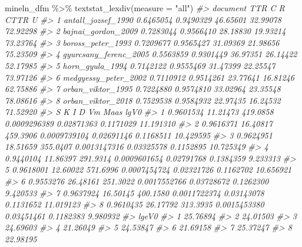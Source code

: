 \documentclass[
]{book}
\newenvironment{Shaded}{\begin{snugshade}}{\end{snugshade}}
\newcommand{\AttributeTok}[1]{\textcolor[rgb]{0.77,0.63,0.00}{#1}}
\newcommand{\CommentTok}[1]{\textcolor[rgb]{0.56,0.35,0.01}{\textit{#1}}}
\newcommand{\FunctionTok}[1]{\textcolor[rgb]{0.00,0.00,0.00}{#1}}
\newcommand{\NormalTok}[1]{#1}
\newcommand{\SpecialCharTok}[1]{\textcolor[rgb]{0.00,0.00,0.00}{#1}}
\newcommand{\StringTok}[1]{\textcolor[rgb]{0.31,0.60,0.02}{#1}}
\begin{document}
\begin{Shaded}
\begin{Highlighting}[]
\NormalTok{mineln\_dfm }\SpecialCharTok{\%\textgreater{}\%}
  \FunctionTok{textstat\_lexdiv}\NormalTok{(}\AttributeTok{measure =} \StringTok{"all"}\NormalTok{)}
\CommentTok{\#\textgreater{}                document       TTR         C        R     CTTR        U}
\CommentTok{\#\textgreater{} 1    antall\_jozsef\_1990 0.6465054 0.9490329 46.65601 32.99078 72.92298}
\CommentTok{\#\textgreater{} 2    bajnai\_gordon\_2009 0.7283044 0.9566410 28.18830 19.93214 73.23764}
\CommentTok{\#\textgreater{} 3     boross\_peter\_1993 0.7209677 0.9565427 31.09369 21.98656 75.23509}
\CommentTok{\#\textgreater{} 4 gyurcsany\_ferenc\_2005 0.5563859 0.9301449 36.97351 26.14422 52.17985}
\CommentTok{\#\textgreater{} 5       horn\_gyula\_1994 0.7142122 0.9555469 31.47399 22.25547 73.97126}
\CommentTok{\#\textgreater{} 6  medgyessy\_peter\_2002 0.7110912 0.9514261 23.77641 16.81246 62.75886}
\CommentTok{\#\textgreater{} 7     orban\_viktor\_1995 0.7224880 0.9574810 33.02964 23.35548 78.08616}
\CommentTok{\#\textgreater{} 8     orban\_viktor\_2018 0.7529538 0.9584932 22.97435 16.24532 71.52920}
\CommentTok{\#\textgreater{}           S        K        I            D         Vm      Maas      lgV0}
\CommentTok{\#\textgreater{} 1 0.9601534 11.21473 419.0858 0.0009296389 0.02871363 0.1171029 11.191310}
\CommentTok{\#\textgreater{} 2 0.9616371 16.40817 459.3906 0.0009739104 0.02691146 0.1168511 10.429595}
\CommentTok{\#\textgreater{} 3 0.9624951 18.51659 355.0407 0.0013147316 0.03325578 0.1152895 10.725349}
\CommentTok{\#\textgreater{} 4 0.9440104 11.86397 291.9314 0.0009601654 0.02791768 0.1384359  9.233313}
\CommentTok{\#\textgreater{} 5 0.9618001 12.60022 571.6996 0.0007454724 0.02321726 0.1162702 10.656921}
\CommentTok{\#\textgreater{} 6 0.9553276 26.48161 251.3022 0.0017552766 0.03728672 0.1262300  9.420533}
\CommentTok{\#\textgreater{} 7 0.9637924 16.50145 400.1580 0.0011722374 0.03143078 0.1131652 11.019123}
\CommentTok{\#\textgreater{} 8 0.9610435 26.17792 313.3935 0.0015453380 0.03451461 0.1182383  9.980932}
\CommentTok{\#\textgreater{}      lgeV0}
\CommentTok{\#\textgreater{} 1 25.76894}
\CommentTok{\#\textgreater{} 2 24.01503}
\CommentTok{\#\textgreater{} 3 24.69603}
\CommentTok{\#\textgreater{} 4 21.26049}
\CommentTok{\#\textgreater{} 5 24.53847}
\CommentTok{\#\textgreater{} 6 21.69158}
\CommentTok{\#\textgreater{} 7 25.37247}
\CommentTok{\#\textgreater{} 8 22.98195}
\end{Highlighting}
\end{Shaded}
\end{document}
